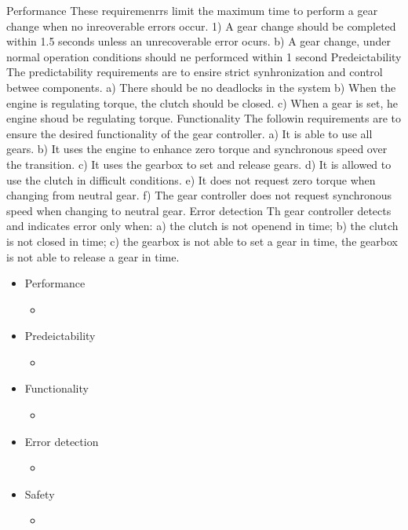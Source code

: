 Performance
These requiremenrrs limit the maximum time to perform a gear change when no inreoverable errors occur.
1) A gear change should be completed within 1.5 seconds unless an unrecoverable error ocurs.
b) A gear change, under normal operation conditions should ne performced within 1 second
Predeictability
The predictability requirements are to ensire strict synhronization and control betwee components.
a) There should be no deadlocks in the system
b) When the engine is regulating torque, the clutch should be closed.
c) When a gear is set, he engine shoud  be regulating torque.
Functionality
The followin requirements are to ensure the desired functionality of the gear controller.
a) It is able to use all gears.
b) It uses the engine to enhance zero torque and synchronous speed over the transition.
c) It uses the gearbox to set and release gears.
d) It is allowed to use the clutch in difficult conditions.
e) It does not request zero torque when changing from neutral gear.
f) The gear controller does not request synchronous speed when changing to neutral gear.
Error detection
Th gear controller detects and indicates error only when:
a) the clutch is not openend in time;
b) the clutch is not closed in time;
c) the gearbox is not able to set a gear in time,
the gearbox is not able to release a gear in time.



\begin{itemize}
	\item Performance
	\begin{itemize}
		\item 
	\end{itemize}
	
	\item Predeictability
	\begin{itemize}
		\item 
	\end{itemize}
	
	
	\item Functionality
	\begin{itemize}
		\item 
	\end{itemize}
	
	\item Error detection
	\begin{itemize}
		\item 
	\end{itemize}
	
	\item Safety
	\begin{itemize}
		\item 
	\end{itemize}
	
\end{itemize}

